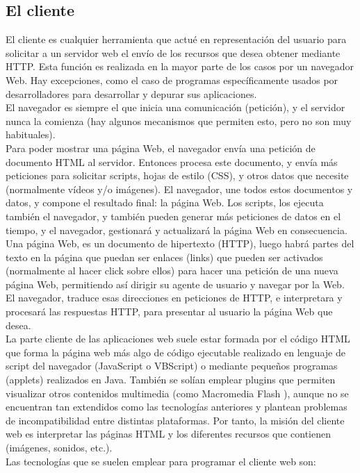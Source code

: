 \subsection{El cliente}
\cite{mdn}El cliente es cualquier herramienta que actué en representación del usuario para solicitar a
un servidor web el envío de los recursos que desea obtener mediante HTTP. Esta función es realizada en la mayor parte de los casos por un navegador Web. Hay excepciones, como el caso de programas específicamente usados por desarrolladores para desarrollar y depurar sus aplicaciones. 
\\
El navegador es siempre el que inicia una comunicación (petición), y el servidor nunca la comienza (hay algunos mecanismos que permiten esto, pero no son muy habituales).  
\\
Para poder mostrar una página Web, el navegador envía una petición de documento HTML al servidor. Entonces procesa este documento, y envía más peticiones para solicitar scripts, hojas de estilo (CSS), y otros datos que necesite (normalmente vídeos y/o imágenes). El navegador, une todos estos documentos y datos, y compone el resultado final: la página Web. Los scripts, los ejecuta también el navegador, y también pueden generar más peticiones de datos en el tiempo, y el navegador, gestionará y actualizará la página Web en consecuencia. 
\\
Una página Web, es un documento de hipertexto (HTTP), luego habrá partes del texto en la página que puedan ser enlaces (links) que pueden ser activados (normalmente al hacer click sobre ellos) para hacer una petición de una nueva página Web, permitiendo así dirigir su agente de usuario y navegar por la Web. El navegador, traduce esas direcciones en peticiones de HTTP, e interpretara y procesará las respuestas HTTP, para presentar al usuario la página Web que desea.
\\
La parte cliente de las aplicaciones web suele estar formada por el código HTML
que forma la página web más algo de código ejecutable realizado en lenguaje de script
del navegador (JavaScript o VBScript) o mediante pequeños programas (applets) realizados en Java. También se solían emplear plugins que permiten visualizar otros
contenidos multimedia (como Macromedia Flash
), aunque no se encuentran tan extendidos como las tecnologías anteriores y plantean problemas de incompatibilidad
entre distintas plataformas. Por tanto, la misión del cliente web es interpretar las
páginas HTML y los diferentes recursos que contienen (imágenes, sonidos, etc.).
\\
Las tecnologías que se suelen emplear para programar el cliente web son:

